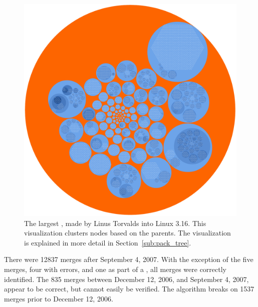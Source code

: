\begin{figure}[htpb]
  \centering
  \includegraphics[width=0.8\linewidth]{Figures/model/big_tree.pdf}
  \caption{The largest \mt{}, made by Linus Torvalds into Linux 3.16.
    This visualization clusters nodes based on the parents. The
    visualization is explained in more detail in
    Section~\ref{sub:pack_tree}.}
  \label{fig:big_tree}
\end{figure}

There were 12837 merges after September 4, 2007. With the exception of
the five merges, four with errors, and one as part of a \foxtrot{}, all
merges were correctly identified. The 835 merges between December 12,
2006, and September 4, 2007, appear to be correct, but cannot easily be
verified. The algorithm breaks on 1537 merges prior to December 12,
2006.

